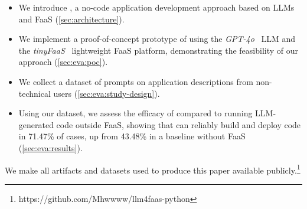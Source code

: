 \begin{itemize}
    \item We introduce \sysname{}, a no-code application development approach based on LLMs and FaaS (\cref{sec:architecture}).
    \item We implement a proof-of-concept prototype of \sysname{} using the \emph{GPT-4o}~\cite{openai2024} LLM and the \emph{tinyFaaS}~\cite{paper_pfandzelter2020_tinyfaas} lightweight FaaS platform, demonstrating the feasibility of our approach (\cref{sec:eva:poc}).
    \item We collect a dataset of prompts on application descriptions from non-technical users (\cref{sec:eva:study-design}).
    \item Using our dataset, we assess the efficacy of \sysname{} compared to running LLM-generated code outside FaaS, showing that \sysname{} can reliably build and deploy code in 71.47\% of cases, up from 43.48\% in a baseline without FaaS (\cref{sec:eva:results}).
\end{itemize}

We make all artifacts and datasets used to produce this paper available publicly.\footnote{https://github.com/Mhwwww/llm4faas-python}
